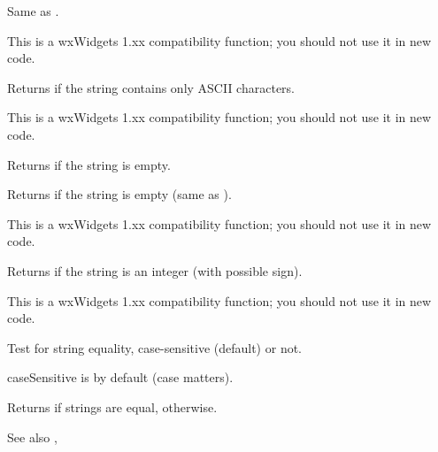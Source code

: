 \label{wxstringindex}



Same as .

This is a wxWidgets 1.xx compatibility function; you should not use it in new code.


\label{wxstringisascii}


Returns \true if the string contains only ASCII characters.

This is a wxWidgets 1.xx compatibility function; you should not use it in new code.


\label{wxstringisempty}


Returns \true if the string is empty.


\label{wxstringisnull}


Returns \true if the string is empty (same as ).

This is a wxWidgets 1.xx compatibility function; you should not use it in new code.


\label{wxstringisnumber}


Returns \true if the string is an integer (with possible sign).

This is a wxWidgets 1.xx compatibility function; you should not use it in new code.


\label{wxstringissameas}


Test for string equality, case-sensitive (default) or not.

caseSensitive is \true by default (case matters).

Returns \true if strings are equal, \false otherwise.

See also , 

